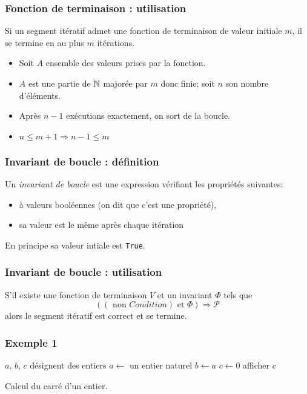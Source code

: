 \begin{frame}
  \frametitle{Fonction de terminaison : utilisation}
\begin{prop}
  Si un segment itératif admet une fonction de terminaison de valeur initiale $m$, il se termine en au plus $m$ itérations.
\end{prop}
\begin{itemize}
  \item Soit $A$ ensemble des valeurs prises par la fonction.
  \item $A$ est une partie de $\mathbb{N}$ majorée par $m$ donc finie; soit $n$ son nombre d'éléments.
  \item Après $n-1$ exécutions exactement, on sort de la boucle.
  \item $n\leq m+1 \Rightarrow n-1 \leq m$
\end{itemize}
\end{frame}

\begin{frame}
  \frametitle{Invariant de boucle : définition}
\begin{defi}
  Un \emph{invariant de boucle} est une expression vérifiant les propriétés suivantes:
\begin{itemize}
  \item à valeurs booléennes (on dit que c'est une propriété),
  \item sa valeur est le même après chaque itération
\end{itemize}
\end{defi}
En principe sa valeur intiale est \texttt{True}.
\end{frame}

\begin{frame}
  \frametitle{Invariant de boucle : utilisation}
\begin{prop}
S'il existe une fonction de terminaison $V$ et un invariant $\Phi$ tels que
\begin{displaymath}
  \left( \left( \text{ non } Condition\right) \text{ et } \Phi \right) \Rightarrow \mathcal{P}
\end{displaymath}
alors le segment itératif est correct et se termine.
\end{prop}
\end{frame}

\begin{frame}
  \frametitle{Exemple 1}
\begin{algorithm}[H]
  $a$, $b$, $c$ désignent des entiers\;
  $a\longleftarrow$ un entier naturel\;
  $b\longleftarrow a$\;
  $c\longleftarrow 0$\;
  afficher $c$\;
  \caption{Calcul du carré d'un entier.}
  \label{corsegit_2}
\end{algorithm}
\end{frame}

